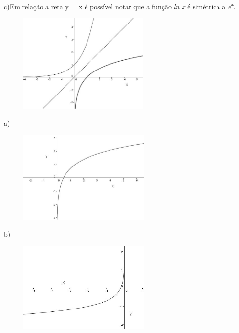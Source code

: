 \begin{respostas}{7}
c)Em relação a reta y = x é possível notar que a função \textit{ln x} é simétrica a \textit{e\textsuperscript{x}}.
\begin{figure}[H]
    \begin{Center}
        \includegraphics[width=2.55in,height=1.94in]{capitulos/logaritmos_e_funcao_logaritmica/media/image25.JPG}
    \end{Center}    
\end{figure} 


    \ansitem{}

a)\begin{figure}[H]
	\begin{Center}
		\includegraphics[width=2.56in,height=1.81in]{capitulos/logaritmos_e_funcao_logaritmica/media/image26.JPG}
	\end{Center}
\end{figure}

b)\begin{figure}[H]
	\begin{Center}
		\includegraphics[width=2.56in,height=1.78in]{capitulos/logaritmos_e_funcao_logaritmica/media/image27.JPG}
	\end{Center}
\end{figure}


\end{respostas}
